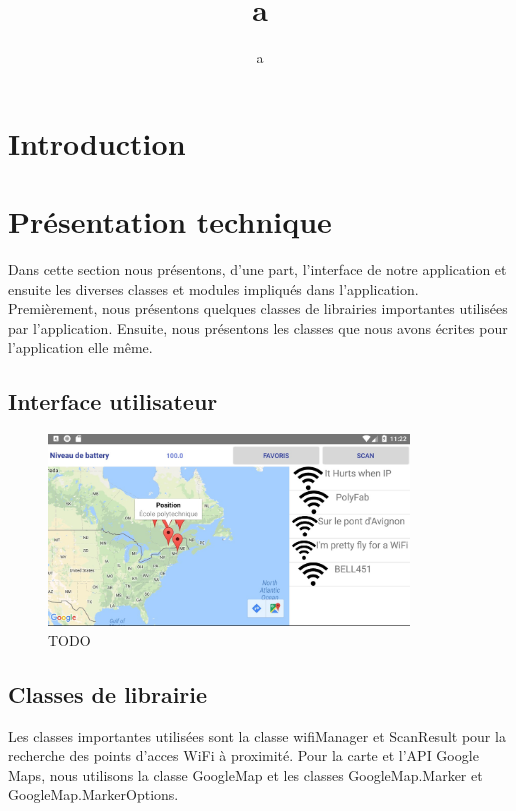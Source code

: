 \documentclass[12pt]{article}
\author{a}
\title{a}
\begin{document}

\setcounter{page}{1}

\tableofcontents

\section{Introduction}

\section{Présentation technique}

	Dans cette section nous présentons, d'une part, l'interface de notre
	application et ensuite les diverses classes et modules impliqués dans
	l'application.  Premièrement, nous présentons quelques classes de librairies
	importantes utilisées par l'application.  Ensuite, nous présentons les
	classes que nous avons écrites pour l'application elle même.

\subsection{Interface utilisateur}
\newcommand{\interfacefigheight}{2in}

	\begin{figure}[h]
		\centering
		\includegraphics[height=\interfacefigheight]{./interface/start_screen.jpg}
		\caption{TODO}
		\label{fig_}
	\end{figure}

\subsection{Classes de librairie}

	Les classes importantes utilisées sont la classe wifiManager et ScanResult
	pour la recherche des points d'acces WiFi à proximité.  Pour la carte et
	l'API Google Maps, nous utilisons la classe GoogleMap et les classes
	GoogleMap.Marker et GoogleMap.MarkerOptions.
\end{document}
